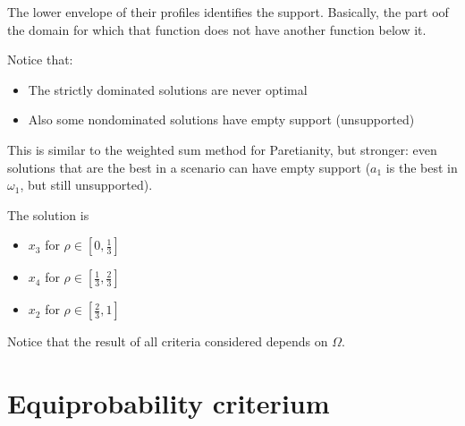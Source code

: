 \begin{center}
\end{center}

The lower envelope of their profiles identifies the support. Basically, the part oof the domain for which that function does not have another function below it.

Notice that: 
\begin{itemize}
	\item The strictly dominated solutions are never optimal 
	
	\item Also some nondominated solutions have empty support (unsupported)
\end{itemize}

This is similar to the weighted sum method for Paretianity, but stronger: even solutions that are the best in a scenario can have empty support ($a_1$ is the best in $\omega_1$, but still unsupported).

The solution is
\begin{itemize}
	\item $x_3$ for $\rho \in \left[0, \frac{1}{3}\right]$
	
	\item $x_4$ for $\rho \in \left[\frac{1}{3}, \frac{2}{3}\right]$
	
	\item $x_2$ for $\rho \in \left[\frac{2}{3}, 1 \right]$
\end{itemize}

Notice that the result of all criteria considered depends on $\Omega$.

\section{Equiprobability criterium}
\label{sec:equiprob}

